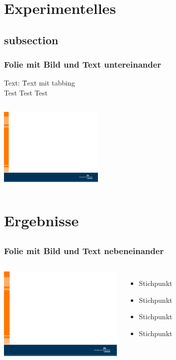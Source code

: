 \section{Experimentelles}
\subsection{subsection}
\begin{frame}
\frametitle{Folie mit Bild und Text untereinander}
\begin{tabbing}
	Text: \qquad \= Text mit tabbing\\
	\> Test Test Test\\
\end{tabbing}
	\vskip5mm
	\begin{columns}
		\column{12cm}
		\centering
		\includegraphics[width=5.0cm]{style/images/master_background}\\
	\end{columns}
\end{frame}

\section{Ergebnisse}
\subsection*{}
\begin{frame}
\frametitle{Folie mit Bild und Text nebeneinander}
	\begin{columns}
		\column{6cm}
		\vskip5mm
		\includegraphics[width=6.0cm]{style/images/master_background}\\
		\vskip5mm
    	\column{5cm}

		\begin{itemize}
		 \item Stichpunkt\newline
      	 \item Stichpunkt\newline
       	 \item Stichpunkt\newline
     	 \item Stichpunkt\newline
		\end{itemize}
	\end{columns}
\end{frame}

